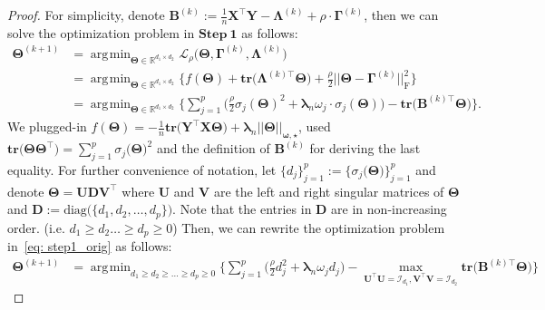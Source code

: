 \documentclass[alpha-refs]{wiley-article}
\DeclareMathOperator*{\argmin}{\arg\!\min}
\begin{document}
\begin{proof}
For simplicity, denote $\boldsymbol{B}^{(k)}:=\frac{1}{n}\boldsymbol{X}^{\top}\boldsymbol{Y}-\boldsymbol{\Lambda}^{(k)}+\rho \cdot \boldsymbol{\Gamma}^{(k)}$, then we can solve the optimization problem in $\textbf{Step}\ \boldsymbol{1}$ as follows:
\begin{align}
    \boldsymbol{\Theta}^{(k+1)}
    &= \argmin_{\boldsymbol{\Theta}\in\mathbb{R}^{d_{1} \times d_{2}}} \mathcal{L}_{\rho} \big( \boldsymbol{\Theta},\boldsymbol{\Gamma}^{(k)},\boldsymbol{\Lambda}^{(k)} \big) \nonumber \\
    &= \argmin_{\boldsymbol{\Theta}\in\mathbb{R}^{d_{1} \times d_{2}}}  \bigg\{ f(\boldsymbol{\Theta}) + \textbf{tr}\big(\boldsymbol{\Lambda}^{(k) \top}\boldsymbol{\Theta}\big) + \frac{\rho}{2} || \boldsymbol{\Theta}-\boldsymbol{\Gamma}^{(k)} ||_{\text{F}}^{2} \bigg\}  \nonumber \\
    &= \argmin_{\boldsymbol{\Theta}\in\mathbb{R}^{d_{1} \times d_{2}}} \bigg\{ \sum_{j=1}^{p} \bigg( \frac{\rho}{2}\sigma_{j}(\boldsymbol{\Theta})^{2} + \boldsymbol{\lambda}_{n} \omega_{j} \cdot\sigma_{j}(\boldsymbol{\Theta}) \bigg) -\textbf{tr} \big( \boldsymbol{B}^{(k) \top}\boldsymbol{\Theta} \big) \bigg\} \label{eq: step1_orig}.
\end{align}
We plugged-in $f(\boldsymbol{\Theta})=-\frac{1}{n}\textbf{tr}\big( \boldsymbol{Y}^{\top}\boldsymbol{X}\boldsymbol{\Theta} \big)+\boldsymbol{\lambda}_{n}||\boldsymbol{\Theta}||_{\boldsymbol{\omega,\star}}$,
used $\textbf{tr}\big(\boldsymbol{\Theta}\boldsymbol{\Theta}^{\top}\big)=\sum_{j=1}^{p}\sigma_{j}\big(\boldsymbol{\Theta}\big)^{2}$ and the definition of $\boldsymbol{B}^{(k)}$ for deriving the last equality.
For further convenience of notation, let $\{d_{j}\}_{j=1}^{p}:=\{\sigma_{j}\big(\boldsymbol{\Theta}\big)\}_{j=1}^{p}$ and
denote $\boldsymbol{\Theta}=\boldsymbol{UDV^{\top}}$ where
$\boldsymbol{U}$ and $\boldsymbol{V}$ are the left and right singular matrices of $\boldsymbol{\Theta}$ and $\boldsymbol{D}:=\text{diag}\big(\{d_{1},d_{2},\dots,d_{p}\}\big)$.
Note that the entries in $\boldsymbol{D}$ are in non-increasing order. (i.e. $d_{1} \geq d_{2} \dots \geq d_{p} \geq 0$)
Then, we can rewrite the optimization problem in~\eqref{eq: step1_orig} as follows:
\begin{align}
    \boldsymbol{\Theta}^{(k+1)}
    &= \argmin_{d_{1}\geq d_{2}\geq \dots \geq d_{p} \geq 0 }\bigg\{ \sum_{j=1}^{p} \bigg( \frac{\rho}{2} d_{j}^{2} + \boldsymbol{\lambda}_{n}\omega_{j}d_{j} \bigg) - \max_{\boldsymbol{U}^{\top}\boldsymbol{U} = \mathcal{I}_{d_{1}}, \boldsymbol{V}^{\top}\boldsymbol{V} = \mathcal{I}_{d_{2}}} \textbf{tr}\big(\boldsymbol{B}^{(k)\top}\boldsymbol{\Theta}\big) \bigg\} \label{eq: step1_sec}

\end{align}
\end{proof}
\end{document}
